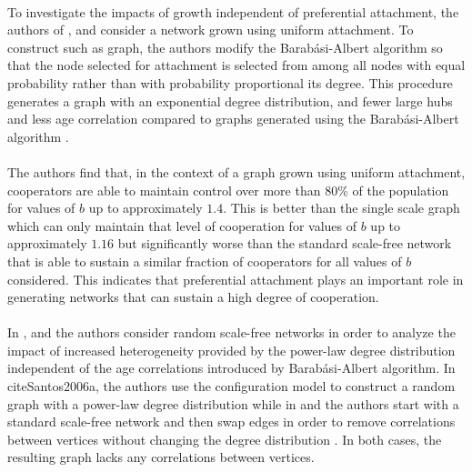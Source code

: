 \documentclass{article}
\begin{document}
	\paragraph{}To investigate the impacts of growth independent of preferential attachment, the authors of  \cite{Pacheco2005}, \cite{Santos2006a} and \cite{Santos2005b} consider a network grown using uniform attachment.  To construct such as graph, the authors modify the Barab\'{a}si-Albert algorithm so that the node selected for attachment is selected from among all nodes with equal probability rather than with probability proportional its degree.  This procedure generates a graph with an exponential degree distribution, and fewer large hubs and less age correlation compared to graphs generated using the Barab\'{a}si-Albert algorithm \cite{Santos2006a}.
	\paragraph{}The authors find that, in the context of a graph grown using uniform attachment, cooperators are able to maintain control over more than 80\% of the population for values of $b$ up to approximately $1.4$.  This is better than the single scale graph which can only maintain that level of cooperation for values of $b$ up to approximately $1.16$ but significantly worse than the standard scale-free network that is able to sustain a similar fraction of cooperators for all values of $b$ considered.  This indicates that preferential attachment plays an important role in generating networks that can sustain a high degree of cooperation.
	\paragraph{}In \cite{Santos2006a}, \cite{Santos2006b} and \cite{Santos2006c} the authors consider random scale-free networks in order to analyze the impact of increased heterogeneity provided by the power-law degree distribution independent of the age correlations introduced by Barab\'{a}si-Albert algorithm.  In cite{Santos2006a}, the authors use the configuration model \cite{Molloy1995} to construct a random graph with a power-law degree distribution while in \cite{Santos2006b} and \cite{Santos2006c} the authors start with a standard scale-free network and then swap edges in order to remove
	\newpage
	 correlations between vertices without changing the degree distribution \cite{Maslov2002}.  In both cases, the resulting graph lacks any correlations between vertices.
\end{document}
